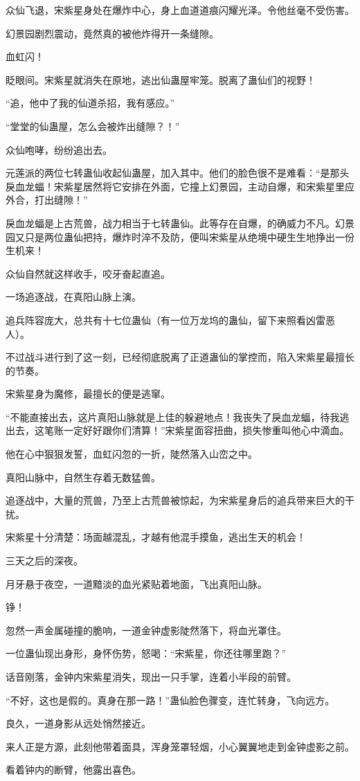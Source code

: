 \begin{this_body}
众仙飞退，宋紫星身处在爆炸中心，身上血道道痕闪耀光泽。令他丝毫不受伤害。

幻景园剧烈震动，竟然真的被他炸得开一条缝隙。

血虹闪！

眨眼间。宋紫星就消失在原地，逃出仙蛊屋牢笼。脱离了蛊仙们的视野！

“追，他中了我的仙道杀招，我有感应。”

“堂堂的仙蛊屋，怎么会被炸出缝隙？！”

众仙咆哮，纷纷追出去。

元莲派的两位七转蛊仙收起仙蛊屋，加入其中。他们的脸色很不是难看：“是那头戾血龙蝠！宋紫星居然将它安排在外面，它撞上幻景园，主动自爆，和宋紫星里应外合，打出缝隙！”

戾血龙蝠是上古荒兽，战力相当于七转蛊仙。此等存在自爆，的确威力不凡。幻景园又只是两位蛊仙把持，爆炸时淬不及防，便叫宋紫星从绝境中硬生生地挣出一份生机来！

众仙自然就这样收手，咬牙奋起直追。

一场追逐战，在真阳山脉上演。

追兵阵容庞大，总共有十七位蛊仙（有一位万龙坞的蛊仙，留下来照看凶雷恶人）。

不过战斗进行到了这一刻，已经彻底脱离了正道蛊仙的掌控而，陷入宋紫星最擅长的节奏。

宋紫星身为魔修，最擅长的便是逃窜。

“不能直接出去，这片真阳山脉就是上佳的躲避地点！我丧失了戾血龙蝠，待我逃出去，这笔账一定好好跟你们清算！”宋紫星面容扭曲，损失惨重叫他心中滴血。

他在心中狠狠发誓，血虹闪忽的一折，陡然落入山峦之中。

真阳山脉中，自然生存着无数猛兽。

追逐战中，大量的荒兽，乃至上古荒兽被惊起，为宋紫星身后的追兵带来巨大的干扰。

宋紫星十分清楚：场面越混乱，才越有他混手摸鱼，逃出生天的机会！

三天之后的深夜。

月牙悬于夜空，一道黯淡的血光紧贴着地面，飞出真阳山脉。

铮！

忽然一声金属碰撞的脆响，一道金钟虚影陡然落下，将血光罩住。

一位蛊仙现出身形，身怀伤势，怒喝：“宋紫星，你还往哪里跑？”

话音刚落，金钟内宋紫星消失，现出一只手掌，连着小半段的前臂。

“不好，这也是假的。真身在那一路！”蛊仙脸色骤变，连忙转身，飞向远方。

良久，一道身影从远处悄然接近。

来人正是方源，此刻他带着面具，浑身笼罩轻烟，小心翼翼地走到金钟虚影之前。

看着钟内的断臂，他露出喜色。

\end{this_body}

